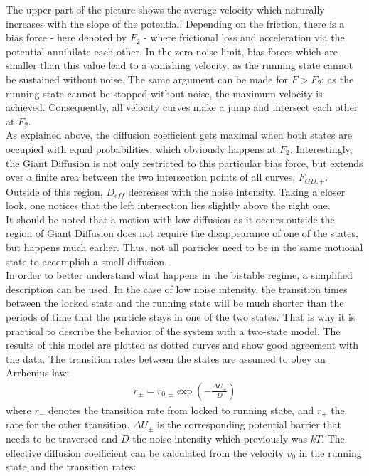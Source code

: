 \documentclass[12pt,a4paper]{article}
\begin{document}
The upper part of the picture shows the average velocity which naturally increases with the slope of the potential. Depending on the friction, there is a bias force - here denoted by $F_2$ - where frictional loss and acceleration via the potential annihilate each other. In the zero-noise limit, bias forces which are smaller than this value lead to a vanishing velocity, as the running state cannot be sustained without noise. The same argument can be made for $F>F_2$: as the running state cannot be stopped without noise, the maximum velocity is achieved. Consequently, all velocity curves make a jump and intersect each other at $F_2$.\\
As explained above, the diffusion coefficient gets maximal when both states are occupied with equal probabilities, which obviously happens at $F_2$. Interestingly, the Giant Diffusion is not only restricted to this particular bias force, but extends over a finite area between the two intersection points of all curves, $F_{GD,\pm}$. Outside of this region, $D_{eff}$ decreases with the noise intensity. Taking a closer look, one notices that the left intersection lies slightly above the right one. \\
It should be noted that a motion with low diffusion as it occurs outside the region of Giant Diffusion does not require the disappearance of one of the states, but happens much earlier. Thus, not all particles need to be in the same motional state to accomplish a small diffusion.\\
In order to better understand what happens in the bistable regime, a simplified description can be used. 
In the case of low noise intensity, the transition times between the locked state and the running state will be much shorter than the periods of time that the particle stays in one of the two states. That is why it is practical to describe the behavior of the system with a two-state model. The results of this model are plotted as dotted curves and show good agreement with the data. The transition rates between the states are assumed to obey an Arrhenius law:
\begin{align}\label{arrhlaw}
r_{\pm}=r_{0,\pm}\exp\left(-\frac{\Delta U_{\pm}}{D}\right)
\end{align}
where $r_-$ denotes the transition rate from locked to running state, and $r_+$ the rate for the other transition. $\Delta U_{\pm}$ is the corresponding potential barrier that needs to be traversed and $D$ the noise intensity which previously was $kT$. The effective diffusion coefficient can be calculated from the velocity $v_0$ in the running state and the transition rates\cite{abp}: 
\end{document}
